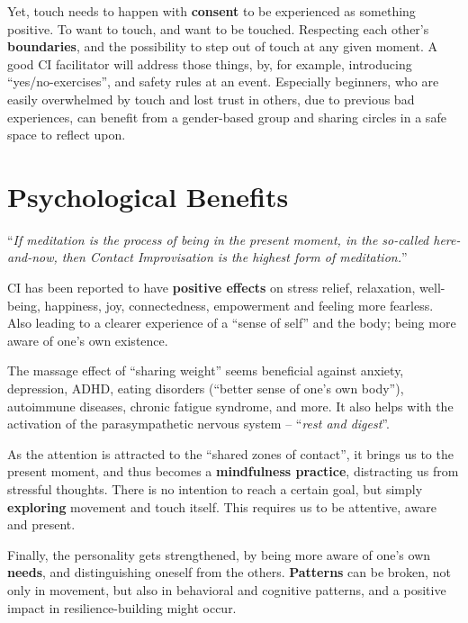 Yet, touch needs to happen with \textbf{consent} to be experienced as something positive.
To want to touch, and want to be touched.
Respecting each other's \textbf{boundaries}, and the possibility to step out of touch at any given moment.
A good CI facilitator will address those things, by, for example, introducing ``yes/no-exercises'', and safety rules at an event.
Especially beginners, who are easily overwhelmed by touch and lost trust in others, due to previous bad experiences, can benefit from a gender-based group and sharing circles in a safe space to reflect upon.

\section{Psychological Benefits}\label{sec:psychological-health-benefits}

\begin{displayquote}
    ``\textit{If meditation is the process of being in the present moment, in the so-called here-and-now, then Contact Improvisation is the highest form of meditation.}''
\end{displayquote}

CI has been reported to have \textbf{positive effects} on stress relief, relaxation, well-being, happiness, joy, connectedness, empowerment and feeling more fearless.
Also leading to a clearer experience of a ``sense of self'' and the body; being more aware of one's own existence.

The massage effect of ``sharing weight'' seems beneficial against anxiety, depression, ADHD, eating disorders (``better sense of one's own body''), autoimmune diseases, chronic fatigue syndrome, and more.
It also helps with the activation of the parasympathetic nervous system -- ``\textit{rest and digest}''.

As the attention is attracted to the ``shared zones of contact'', it brings us to the present moment, and thus becomes a \textbf{mindfulness practice}, distracting us from stressful thoughts.
There is no intention to reach a certain goal, but simply \textbf{exploring} movement and touch itself.
This requires us to be attentive, aware and present.

Finally, the personality gets strengthened, by being more aware of one's own \textbf{needs}, and distinguishing oneself from the others.
\textbf{Patterns} can be broken, not only in movement, but also in behavioral and cognitive patterns, and a positive impact in resilience-building might occur.

